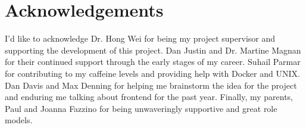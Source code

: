 \section{Acknowledgements}
I'd like to acknowledge Dr. Hong Wei for being my project supervisor and supporting the development of this project. Dan Justin and Dr. Martine Magnan for their continued support through the early stages of my career. Suhail Parmar for contributing to my caffeine levels and providing help with Docker and UNIX. Dan Davis and Max Denning for helping me brainstorm the idea for the project and enduring me talking about frontend for the past year. Finally, my parents, Paul and Joanna Fazzino for being unwaveringly supportive and great role models.
\pagebreak
